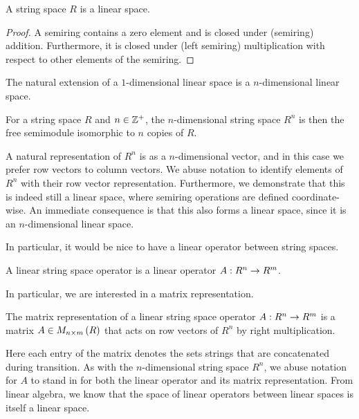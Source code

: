 \begin{theorem}
  A string space \(R\) is a linear space.
\end{theorem}
\begin{proof}
  A semiring contains a zero element and is closed under
  (semiring) addition.
  Furthermore,
  it is closed under (left semiring) multiplication
  with respect to other elements of the semiring.
\end{proof}

The natural extension of a \(1\)-dimensional linear space
is a \(n\)-dimensional linear space.

\begin{definition}
  For a string space \(R\) and \(n \in \mathbb{Z}^{+}\),
  the \(n\)-dimensional string space \(R^n\) is then the
  free semimodule isomorphic to \(n\) copies of \(R\).
\end{definition}

A natural representation of \(R^n\) is as a \(n\)-dimensional vector,
and in this case we prefer row vectors to column vectors.
We abuse notation to identify elements of \(R^n\) with their
row vector representation.
Furthermore, we demonstrate that this is indeed still a linear space,
where semiring operations are defined coordinate-wise.
An immediate consequence is that this also forms a linear space,
since it is an \(n\)-dimensional linear space.


In particular, it would be nice to have a linear operator
between string spaces.

\begin{definition}
  A linear string space operator
  is a linear operator \(A : R^n \to R^m\).
\end{definition}

In particular, we are interested in a matrix representation.

\begin{definition}
  The matrix representation of a linear string space operator
  \(A : R^n \to R^m\) is a matrix
  \(A \in M_{n \times m} \left(R\right)\) that
  acts on row vectors of \(R^n\) by right multiplication.
\end{definition}

Here each entry of the matrix denotes the sets strings that are
concatenated during transition.
As with the \(n\)-dimensional string space \(R^n\),
we abuse notation for \(A\) to stand in for
both the linear operator and its matrix representation.
From linear algebra, we know that the space of linear operators between
linear spaces is itself a linear space.

